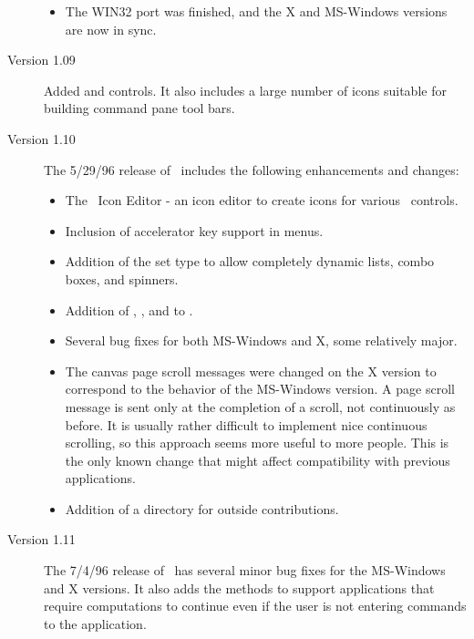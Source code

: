 \begin{description}
\begin{itemize}
\item The WIN32 port was finished, and the X and MS-Windows versions
are now in sync.

\end{itemize}

\item[Version 1.09]
Added  and
 controls. It also includes a large
number of \V icons suitable for building command pane
tool bars.

\item[Version 1.10]
The 5/29/96 release of \V\ includes the following enhancements
and changes:

\begin{itemize}

\item The \V\ Icon Editor - an icon editor to
create icons for various \V\ controls.

\item Inclusion of accelerator key support in menus.

\item Addition of the  set type to allow
completely dynamic lists, combo boxes, and spinners.

\item Addition of , , and
 to .

\item Several bug fixes for both MS-Windows and X, some relatively
major.

\item The canvas page scroll messages were changed
on the X version to correspond to the behavior of the MS-Windows version.
A page scroll message is sent only at the completion of
a scroll, not continuously as before. It is usually rather
difficult to implement nice continuous scrolling, so this
approach seems more useful to more people. This is the only
known change that might affect compatibility with previous
\V applications.

\item Addition of a directory for outside contributions.

\end{itemize}

\item[Version 1.11]

The 7/4/96 release of \V\ has several minor bug fixes for the
MS-Windows and X versions. It also adds the  methods
to support applications that require computations to continue
even if the user is not entering commands to the application.


\end{description}
